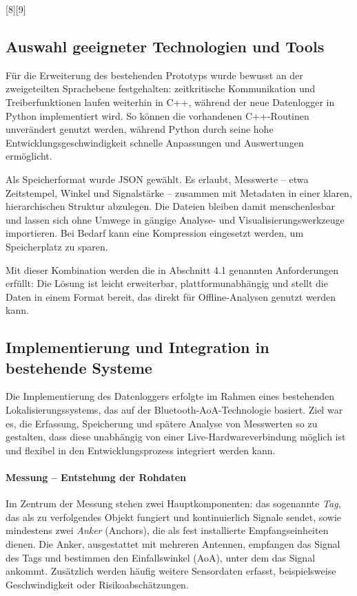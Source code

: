 \documentclass[a4paper, 12pt]{article} %
\begin{document}
[8][9]
\subsection{Auswahl geeigneter Technologien und Tools}
Für die Erweiterung des bestehenden Prototyps wurde bewusst an der zweigeteilten Sprachebene festgehalten: 
zeitkritische Kommunikation und Treiberfunktionen laufen weiterhin in C++, während der neue Datenlogger in Python 
implementiert wird. So können die vorhandenen C++-Routinen unverändert genutzt werden, während Python durch seine hohe 
Entwicklungsgeschwindigkeit schnelle Anpassungen und Auswertungen ermöglicht.

Als Speicherformat wurde \ac{JSON} gewählt. Es erlaubt, Messwerte – etwa Zeitstempel, Winkel und 
Signalstärke – zusammen mit Metadaten in einer klaren, hierarchischen Struktur abzulegen. Die Dateien bleiben damit menschenlesbar 
und lassen sich ohne Umwege in gängige Analyse- und Visualisierungswerkzeuge importieren. Bei Bedarf kann eine Kompression eingesetzt werden, 
um Speicherplatz zu sparen.

Mit dieser Kombination werden die in Abschnitt 4.1 genannten Anforderungen erfüllt: Die Lösung ist leicht erweiterbar, 
plattform­unabhängig und stellt die Daten in einem Format bereit, das direkt für Offline-Analysen genutzt werden kann.

\subsection{Implementierung und Integration in bestehende Systeme}

Die Implementierung des Datenloggers erfolgte im Rahmen eines bestehenden Lokalisierungssystems, das auf der Bluetooth-\ac{AoA}-Technologie 
basiert. Ziel war es, die Erfassung, Speicherung und spätere Analyse von Messwerten so zu gestalten, dass diese unabhängig
von einer Live-Hardwareverbindung möglich ist und flexibel in den Entwicklungsprozess integriert werden kann.

\paragraph{Messung – Entstehung der Rohdaten}

Im Zentrum der Messung stehen zwei Hauptkomponenten: das sogenannte \textit{Tag}, das als zu verfolgendes Objekt fungiert 
und kontinuierlich Signale sendet, sowie mindestens zwei \textit{Anker} (Anchors), die als fest installierte Empfangseinheiten dienen. 
Die Anker, ausgestattet mit mehreren Antennen, empfangen das Signal des Tags und bestimmen den Einfallswinkel (\acf{AoA}), unter dem 
das Signal ankommt. Zusätzlich werden häufig weitere Sensordaten erfasst, beispielsweise Geschwindigkeit oder Risikoabschätzungen.
\end{document}
